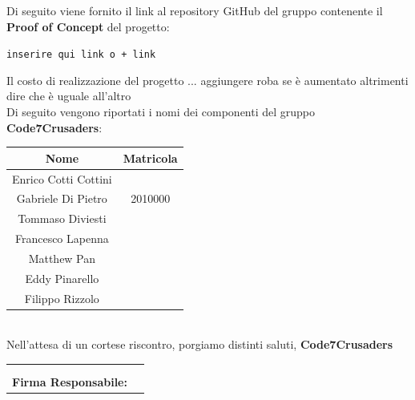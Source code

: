 \documentclass{article}
\begin{document}
Di seguito viene fornito il link al repository GitHub del gruppo contenente il \textbf{Proof of Concept} del progetto:
\begin{center}
    \texttt{inserire qui link o + link}
\end{center}
Il costo di realizzazione del progetto ... aggiungere roba se è aumentato altrimenti dire che è uguale all'altro\\
\newpage
Di seguito vengono riportati i nomi dei componenti del gruppo \textbf{Code7Crusaders}:\\
\vspace{2cm}
\begin{tabular}{|c|c|}
    \hline
    \textbf{Nome} & \textbf{Matricola} \\
    \hline
    Enrico Cotti Cottini &  \\ 
    \hline
    Gabriele Di Pietro & 2010000 \\ 
    \hline
    Tommaso Diviesti &  \\ 
    \hline %
    Francesco Lapenna &  \\ 
    \hline
    Matthew Pan & \\ 
    \hline %
    Eddy Pinarello & \\ 
    \hline %
    Filippo Rizzolo & \\ 
    \hline %
\end{tabular}
\\
\vspace{3cm}
Nell'attesa di un cortese riscontro, porgiamo distinti saluti, \textbf{Code7Crusaders}

\begin{table}[b]
	\begin{tabular}{@{}p{2in}p{3in}@{}}
			   &     		\\
			   &     		\\
		\textbf{Firma Responsabile:} & \hrulefill \\
	\end{tabular}
\end{table}
\end{document}
